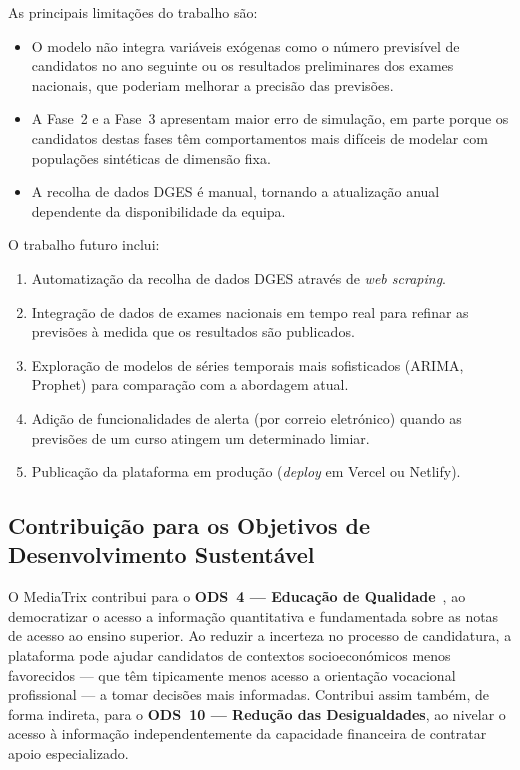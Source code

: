\documentclass[12pt,a4paper]{article}
\begin{document}
As principais limitações do trabalho são:

\begin{itemize}[noitemsep]
  \item O modelo não integra variáveis exógenas como o número previsível de candidatos no ano seguinte ou os resultados preliminares dos exames nacionais, que poderiam melhorar a precisão das previsões.
  \item A Fase~2 e a Fase~3 apresentam maior erro de simulação, em parte porque os candidatos destas fases têm comportamentos mais difíceis de modelar com populações sintéticas de dimensão fixa.
  \item A recolha de dados DGES é manual, tornando a atualização anual dependente da disponibilidade da equipa.
\end{itemize}

O trabalho futuro inclui:

\begin{enumerate}[noitemsep]
  \item Automatização da recolha de dados DGES através de \textit{web scraping}.
  \item Integração de dados de exames nacionais em tempo real para refinar as previsões à medida que os resultados são publicados.
  \item Exploração de modelos de séries temporais mais sofisticados (ARIMA, Prophet) para comparação com a abordagem atual.
  \item Adição de funcionalidades de alerta (por correio eletrónico) quando as previsões de um curso atingem um determinado limiar.
  \item Publicação da plataforma em produção (\textit{deploy} em Vercel ou Netlify).
\end{enumerate}

\subsection{Contribuição para os Objetivos de Desenvolvimento Sustentável}

O MediaTrix contribui para o \textbf{ODS~4 --- Educação de Qualidade}~\cite{sdgs}, ao democratizar o acesso a informação quantitativa e fundamentada sobre as notas de acesso ao ensino superior. Ao reduzir a incerteza no processo de candidatura, a plataforma pode ajudar candidatos de contextos socioeconómicos menos favorecidos --- que têm tipicamente menos acesso a orientação vocacional profissional --- a tomar decisões mais informadas. Contribui assim também, de forma indireta, para o \textbf{ODS~10 --- Redução das Desigualdades}, ao nivelar o acesso à informação independentemente da capacidade financeira de contratar apoio especializado.

\nocite{dges,kedgey}


\end{document}

